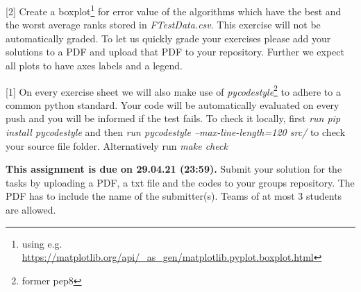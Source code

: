 \documentclass{exam}
\begin{document}
\begin{questions}
		[2]
		Create a boxplot\footnote{using e.g. \url{https://matplotlib.org/api/_as_gen/matplotlib.pyplot.boxplot.html}} for error value of the algorithms which have the best and the worst average ranks stored in \textit{FTestData.csv}.
		This exercise will not be automatically graded. To let us quickly grade your exercises please add your solutions to a PDF and upload that PDF to your repository. Further we expect all plots to have axes labels and a legend.
				
	
	On every exercise sheet we will also make use of \textit{pycodestyle}\footnote{former pep8} to adhere to a common python standard. Your code will be automatically evaluated on every push and you will be informed if the test fails. To check it locally, first \textit{run pip install pycodestyle} and then \textit{run pycodestyle --max-line-length=120 src/} to check your source file folder. Alternatively run \textit{make check}
	\end{questions}
	
	\textbf{This assignment is due on 29.04.21 (23:59).} Submit your solution for the tasks by uploading a PDF, a txt file and the codes to your groups repository. The PDF has to include the name of the submitter(s). Teams of at most 3 students are allowed.
\end{document}
